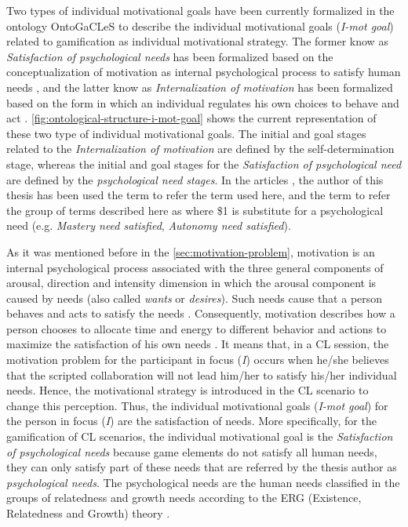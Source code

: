 Two types of individual motivational goals have been currently formalized in the ontology OntoGaCLeS to describe the individual motivational goals (\emph{I-mot goal}) related to gamification as individual motivational strategy. The former know as \emph{Satisfaction of psychological needs} has been formalized based on the conceptualization of motivation as internal psychological process to satisfy human needs \cite{PritchardAshwood2008}, and the latter know as \emph{Internalization of motivation} has been formalized based on the form in which an individual regulates his own choices to behave and act \cite{DeciRyan2010}. \autoref{fig:ontological-structure-i-mot-goal} shows the current representation of these two type of individual motivational goals. The initial and goal stages related to the \emph{Internalization of motivation} are defined by the self-determination stage, whereas the initial and goal stages for the \emph{Satisfaction of psychological need} are defined by the \emph{psychological need stages}. In the articles  \cite{ChallcoMoreiraBittencourtMizoguchiIsotani2015, ChallcoMoreiraMizoguchiIsotani2014, ChallcoMoreiraMizoguchiIsotani2014a}, the author of this thesis has been used the term  to refer the term  used here, and the term  to refer the group of terms described here as  where \$1 is substitute for a psychological need (e.g. \emph{Mastery need satisfied}, \emph{Autonomy need satisfied}).

As it was mentioned before in the \autoref{sec:motivation-problem}, motivation is an internal psychological process associated with the three general components of arousal, direction and intensity dimension in which the arousal component is caused by needs (also called \emph{wants} or \emph{desires}). Such needs cause that a person behaves and acts to satisfy the needs \cite{MitchellDaniels2003}. Consequently, motivation describes how a person chooses to allocate time and energy to different behavior and actions to maximize the satisfaction of his own needs \cite{PritchardAshwood2008}. It means that, in a CL session, the motivation problem for the participant in focus (\emph{I}) occurs when he/she believes that the scripted collaboration will not lead him/her to satisfy his/her individual needs. Hence, the motivational strategy is introduced in the CL scenario to change this perception. Thus, the individual motivational goals (\emph{I-mot goal}) for the person in focus (\emph{I}) are the satisfaction of needs. More specifically, for the gamification of CL scenarios, the individual motivational goal is the \emph{Satisfaction of psychological needs} because game elements do not satisfy all human needs, they can only satisfy part of these needs that are referred by the thesis author as \emph{psychological needs}. The psychological needs are the human needs classified in the groups of relatedness and growth needs according to the ERG (Existence, Relatedness and Growth) theory \cite{Alderfer1972}.

